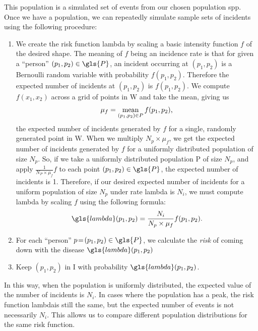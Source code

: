 This population is a simulated set of \glspl{event} from our chosen population \gls{spp}.
Once we have a population,
we can repeatedly simulate sample sets of \glspl{incident} using the following procedure:
\begin{enumerate}
    \item We create the risk function \gls{lambda}
        by scaling a basic \gls{intensity} function $f$ of the desired shape.
        The meaning of $f$ being an \gls{incidence rate} is that for given a ``person'' $(p_1, p_2) \in \gls{P}$,
        an incident occurring at $(p_1, p_2)$ is a Bernoulli random variable with probability $f(p_1, p_2)$.
        Therefore the expected number of \glspl{incident} at $(p_1, p_2)$ is $f(p_1, p_2)$.
        We compute $f(x_1, x_2)$ across a grid of points in \gls{W} and take the mean,
        giving us
        $$
            \mu_f = \operatorname*{\mbox{mean}}\limits_{(p_1, p_2) \in P}{f(p_1,p_2)} \text{,}
        $$
        the expected number of \glspl{incident} generated by $f$ for a single, randomly generated point in \gls{W}.
        When we multiply $N_p \times \mu_f$,
        we get the expected number of \glspl{incident} generated by $f$
        for a uniformly distributed population of size $N_p$.
        So, if we take a uniformly distributed population \gls{P} of size $N_p$,
        and apply $\frac{1}{N_P \times \mu_f} f$ to each point $(p_1, p_2) \in \gls{P}$,
        the expected number of \glspl{incident} is 1.
        Therefore, if our desired expected number of \glspl{incident} for a uniform population of size $N_p$
        under rate \gls{lambda} is $N_i$,
        we must compute \gls{lambda} by scaling $f$ using the following formula:
        $$
            \gls{lambda}(p_1, p_2) = \frac{N_i}{N_p \times \mu_f} f(p_1, p_2)\text{.}
        $$
    \item For each ``person'' $p\!=\!(p_1, p_2) \in \gls{P}$,
        we calculate the \textit{risk} of coming down with the disease $\gls{lambda}(p_1, p_2)$
    \item Keep $(p_1, p_2)$ in \gls{I} with probability $\gls{lambda}(p_1, p_2)$.
\end{enumerate}

In this way,
when the population is uniformly distributed,
the expected value of the number of \glspl{incident} is $N_i$.
In cases where the population has a peak,
the risk function \gls{lambda}\dotdot is still the same,
but the expected number of \glspl{event} is not necessarily $N_i$.
This allows us to compare different population distributions for the same risk function.

